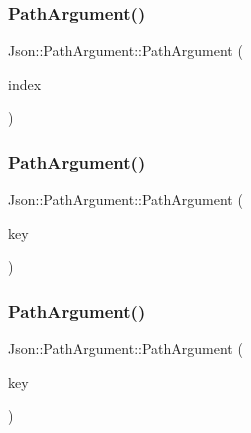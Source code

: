 \mbox{\label{classJson_1_1PathArgument_a53c5b27143b161301b95fd544c139ecf_a53c5b27143b161301b95fd544c139ecf}} 
\subsubsection{\texorpdfstring{Path\+Argument()}{PathArgument()}\hspace{0.1cm}{\footnotesize\ttfamily [2/4]}}
{\footnotesize\ttfamily Json\+::\+Path\+Argument\+::\+Path\+Argument (\begin{DoxyParamCaption}\item[{\hyperlink{namespaceJson_a8048e741f2177c3b5d9ede4a5b8c53c2_a8048e741f2177c3b5d9ede4a5b8c53c2}{Array\+Index}}]{index }\end{DoxyParamCaption})}

\mbox{\label{classJson_1_1PathArgument_a9690417a8a40e6e49f2acdf6c9281345_a9690417a8a40e6e49f2acdf6c9281345}} 
\subsubsection{\texorpdfstring{Path\+Argument()}{PathArgument()}\hspace{0.1cm}{\footnotesize\ttfamily [3/4]}}
{\footnotesize\ttfamily Json\+::\+Path\+Argument\+::\+Path\+Argument (\begin{DoxyParamCaption}\item[{const char $\ast$}]{key }\end{DoxyParamCaption})}

\mbox{\label{classJson_1_1PathArgument_ac15f25452124fbf21218897113015301_ac15f25452124fbf21218897113015301}} 
\subsubsection{\texorpdfstring{Path\+Argument()}{PathArgument()}\hspace{0.1cm}{\footnotesize\ttfamily [4/4]}}
{\footnotesize\ttfamily Json\+::\+Path\+Argument\+::\+Path\+Argument (\begin{DoxyParamCaption}\item[{const \hyperlink{json_8h_a1e723f95759de062585bc4a8fd3fa4be_a1e723f95759de062585bc4a8fd3fa4be}{J\+S\+O\+N\+C\+P\+P\+\_\+\+S\+T\+R\+I\+NG} \&}]{key }\end{DoxyParamCaption})}




